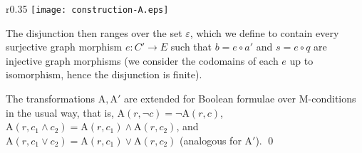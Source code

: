 \documentclass{llncs}
\begin{document}
\begin{wrapfigure}[10]{r}{0.35\textwidth}
	\centering
		\vspace{-25pt}
		\texttt{[image: construction-A.eps]}
\end{wrapfigure}
	\noindent The disjunction then ranges over the set $\varepsilon$, which we define to contain every surjective graph morphism $e\!: C' \rightarrow E$ such that $b = e \circ a'$ and $s = e \circ q$ are injective graph morphisms (we consider the codomains of each $e$ up to isomorphism, hence the disjunction is finite).

	The transformations $\text{A},\text{A}'$ are extended for Boolean formulae over M-conditions in the usual way, that is, $\text{A}(r,\neg c) = \neg\text{A}(r,c)$, $\text{A}(r,c_1\wedge c_2) = \text{A}(r,c_1)\wedge\text{A}(r,c_2)$, and $\text{A}(r,c_1\vee c_2) = \text{A}(r,c_1)\vee\text{A}(r,c_2)$ (analogous for $\text{A}'$).
	\qed
\end{document}
